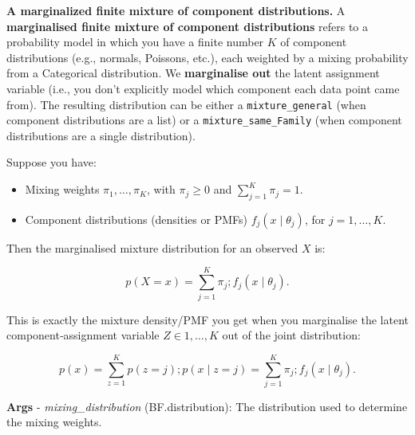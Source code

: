 \documentclass[
  letterpaper,
  DIV=11,
  numbers=noendperiod]{scrartcl}
\providecommand{\tightlist}{%
  \setlength{\itemsep}{0pt}\setlength{\parskip}{0pt}}\usepackage{longtable,booktabs,array}
\begin{document}
\textbf{A marginalized finite mixture of component distributions.} A
\textbf{marginalised finite mixture of component distributions} refers
to a probability model in which you have a finite number \(K\) of
component distributions (e.g., normals, Poissons, etc.), each weighted
by a mixing probability from a Categorical distribution. We
\textbf{marginalise out} the latent assignment variable (i.e., you don't
explicitly model which component each data point came from). The
resulting distribution can be either a \texttt{mixture\_general} (when
component distributions are a list) or a \texttt{mixture\_same\_Family}
(when component distributions are a single distribution).

Suppose you have:

\begin{itemize}
\tightlist
\item
  Mixing weights \(\pi_1, \dots, \pi_K\), with \(\pi_j \ge 0\) and
  \(\sum_{j=1}^K \pi_j = 1\).
\item
  Component distributions (densities or PMFs) \(f_j(x \mid \theta_j)\),
  for \(j = 1,\dots,K\).
\end{itemize}

Then the marginalised mixture distribution for an observed \(X\) is:

\[
  p(X = x) = \sum_{j=1}^K \pi_j ; f_j(x \mid \theta_j).
  \]

This is exactly the mixture density/PMF you get when you marginalise the
latent component‑assignment variable \(Z \in {1,\dots,K}\) out of the
joint distribution:

\[
  p(x) = \sum_{z=1}^K p(z = j); p(x \mid z = j) = \sum_{j=1}^K \pi_j ; f_j(x \mid \theta_j).
  \]

\textbf{Args} - \emph{mixing\_distribution} (BF.distribution): The
distribution used to determine the mixing weights.
\end{document}
